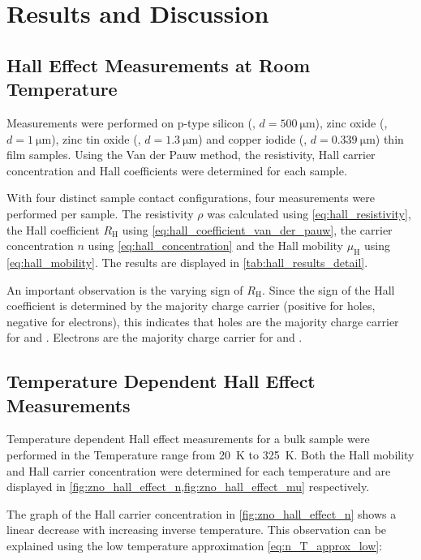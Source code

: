 \section{Results and Discussion}
\subsection{Hall Effect Measurements at Room Temperature}
Measurements were performed on p-type silicon (, $d=\qty{500}{\micro\meter}$), 
zinc oxide (, $d=\qty{1}{\micro\meter}$), zinc tin oxide (, 
$d=\qty{1.3}{\micro\meter}$) and copper iodide (, $d=\qty{0.339}{\micro\meter}$) 
thin film samples.
Using the Van der Pauw method, the resistivity, Hall carrier concentration and Hall 
coefficients were determined for each sample.

With four distinct sample contact configurations, four measurements were performed 
per sample. 
The resistivity $\rho$ was calculated using \cref{eq:hall_resistivity}, 
the Hall coefficient $R_{\mathrm{H}}$ using \cref{eq:hall_coefficient_van_der_pauw},
the carrier concentration $n$ using \cref{eq:hall_concentration} 
and the Hall mobility $\mu_{\mathrm{H}}$ using \cref{eq:hall_mobility}.
The results are displayed in \cref{tab:hall_results_detail}.

An important observation is the varying sign of $R_{\mathrm{H}}$. 
Since the sign of the Hall coefficient is determined by the majority charge carrier
(positive for holes, negative for electrons), this indicates that holes are the majority
charge carrier for  and . 
Electrons are the majority charge carrier for  and . 

\subsection{Temperature Dependent Hall Effect Measurements}
Temperature dependent Hall effect measurements for a bulk  sample 
were performed in the Temperature range from \qty{20}{\kelvin} to \qty{325}{\kelvin}.
Both the Hall mobility and Hall carrier concentration were determined for each 
temperature and are displayed in 
\cref{fig:zno_hall_effect_n,fig:zno_hall_effect_mu} respectively.

The graph of the Hall carrier concentration in \cref{fig:zno_hall_effect_n} shows a 
linear decrease with increasing inverse temperature. 
This observation can be explained using the low temperature approximation 
\cref{eq:n_T_approx_low}:


